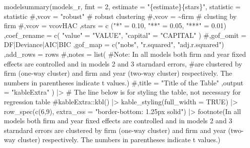 \documentclass[
  letterpaper,
  DIV=11,
  numbers=noendperiod]{scrreprt}
\newenvironment{Shaded}{\begin{snugshade}}{\end{snugshade}}
\newcommand{\AttributeTok}[1]{\textcolor[rgb]{0.40,0.45,0.13}{#1}}
\newcommand{\CommentTok}[1]{\textcolor[rgb]{0.37,0.37,0.37}{#1}}
\newcommand{\ConstantTok}[1]{\textcolor[rgb]{0.56,0.35,0.01}{#1}}
\newcommand{\DecValTok}[1]{\textcolor[rgb]{0.68,0.00,0.00}{#1}}
\newcommand{\FloatTok}[1]{\textcolor[rgb]{0.68,0.00,0.00}{#1}}
\newcommand{\FunctionTok}[1]{\textcolor[rgb]{0.28,0.35,0.67}{#1}}
\newcommand{\NormalTok}[1]{\textcolor[rgb]{0.00,0.23,0.31}{#1}}
\newcommand{\OtherTok}[1]{\textcolor[rgb]{0.00,0.23,0.31}{#1}}
\newcommand{\SpecialCharTok}[1]{\textcolor[rgb]{0.37,0.37,0.37}{#1}}
\newcommand{\StringTok}[1]{\textcolor[rgb]{0.13,0.47,0.30}{#1}}
\begin{document}
\begin{Shaded}
\begin{Highlighting}[]
\FunctionTok{modelsummary}\NormalTok{(models\_r, }\AttributeTok{fmt =} \DecValTok{2}\NormalTok{,}
\AttributeTok{estimate =} \StringTok{"\{estimate\}\{stars\}"}\NormalTok{,}
\AttributeTok{statistic =} \StringTok{\textquotesingle{}statistic\textquotesingle{}}
\CommentTok{\#,vcov = "robust" \# robust clustering }
\CommentTok{\#,vcov = \textasciitilde{}firm \# clusting by firm}
\CommentTok{\#,vcov = vcovHAC}
\NormalTok{,}\AttributeTok{stars =} \FunctionTok{c}\NormalTok{ (}\StringTok{"*"} \OtherTok{=} \FloatTok{0.10}\NormalTok{, }\StringTok{"**"} \OtherTok{=} \FloatTok{0.05}\NormalTok{, }\StringTok{"***"} \OtherTok{=}  \FloatTok{0.01}\NormalTok{)}
\NormalTok{,}\AttributeTok{coef\_rename =} \FunctionTok{c}\NormalTok{(}
    \StringTok{"value"} \OtherTok{=} \StringTok{"VALUE"}\NormalTok{,}
    \StringTok{"capital"} \OtherTok{=} \StringTok{"CAPITAL"}
\NormalTok{)}
\CommentTok{\#,gof\_omit = \textquotesingle{}DF|Deviance|AIC|BIC\textquotesingle{}}
\NormalTok{,}\AttributeTok{gof\_map =} \FunctionTok{c}\NormalTok{(}\StringTok{"nobs"}\NormalTok{, }\StringTok{"r.squared"}\NormalTok{, }\StringTok{"adj.r.squared"}\NormalTok{)}
\NormalTok{,}\AttributeTok{add\_rows =}\NormalTok{ rows}
\CommentTok{\#,notes = list(}
\CommentTok{\#\textquotesingle{}Note: In all models both firm and year fixed effects are controlled and in models 2 and 3 starndard errors\textquotesingle{}, }
\CommentTok{\#\textquotesingle{}are clustered by firm (one{-}way cluster) and firm and year (two{-}way cluster) respectively. The numbers in parentheses indicate t values.\textquotesingle{})}
\CommentTok{\#,title = "Title of the Table"}
\NormalTok{,}\AttributeTok{output =} \StringTok{"kableExtra"}
\NormalTok{) }\SpecialCharTok{|\textgreater{}}
\CommentTok{\# The line below is for styling the table, not necessary for regression table}
\CommentTok{\#kableExtra::kbl() |\textgreater{}}
\FunctionTok{kable\_styling}\NormalTok{(}\AttributeTok{full\_width =} \ConstantTok{TRUE}\NormalTok{) }\SpecialCharTok{|\textgreater{}}
\FunctionTok{row\_spec}\NormalTok{(}\FunctionTok{c}\NormalTok{(}\DecValTok{6}\NormalTok{,}\DecValTok{9}\NormalTok{), }\AttributeTok{extra\_css =} \StringTok{"border{-}bottom: 1.25px solid"}\NormalTok{) }\SpecialCharTok{|\textgreater{}}
\FunctionTok{footnote}\NormalTok{(}\StringTok{\textquotesingle{}In all models both firm and year fixed effects are controlled and in models 2 and 3 starndard errors are clustered by firm (one{-}way cluster) and firm and year (two{-}way cluster) respectively. The numbers in parentheses indicate t values.\textquotesingle{}}\NormalTok{)}
\end{Highlighting}
\end{Shaded}
\end{document}
